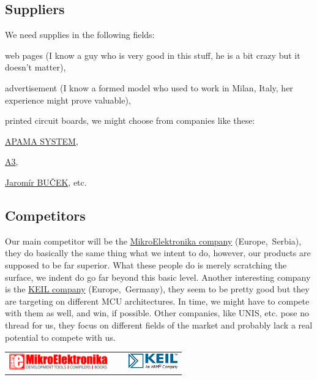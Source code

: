 \documentclass[a4paper,twoside,15pt]{book}
\begin{document}
		\subsection{Suppliers}
			We need supplies in the following fields:
				\begin{dinglist}{73}
					\item web pages (I know a guy who is very good in this stuff, he is a bit crazy but it doesn't matter),
					\item advertisement (I know a formed model who used to work in Milan, Italy, her experience might prove valuable),
					\item printed circuit boards, we might choose from companies like these:
					\begin{dinglist}{75}
						\item \href{http://www.apama.cz/}{APAMA SYSTEM},
						\item \href{http://www.a3.cz}{A3},
						\item \href{http://www.bucek.name/}{Jaromír BUČEK}, etc.
					\end{dinglist}
				\end{dinglist}

		\subsection{Competitors}
			Our main competitor will be the \href{http://www.mikroe.com/}{MikroElektronika company} (Europe,~Serbia), they do basically the same thing what we intent to do, however, our products are supposed to be far superior. What these people do is merely scratching the surface, we indent do go far beyond this basic level. Another interesting company is the \href{http://www.keil.com/}{KEIL company} (Europe,~Germany), they seem to be pretty good but they are targeting on different MCU architectures. In time, we might have to compete with them as well, and win, if possible. Other companies, like UNIS, etc. pose no thread for us, they focus on different fields of the market and probably lack a real potential to compete with us.
			\begin{table}[h!]
				\centering{}
				\begin{tabular}{cp{40pt}c}
					\includegraphics[width=120pt]{images/MikroElektronika_logo.png}
						& ~ &
					\includegraphics[width=60pt]{images/KeilARM.jpg} \\
				\end{tabular}
			\end{table}
\end{document}
